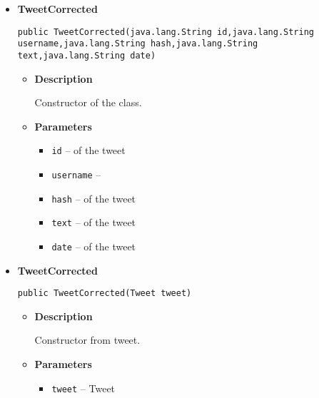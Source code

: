 {{{{{{{{\begin{itemize}
{\begin{itemize}
{Constructor of the class.
}
\item{
{\bf  Parameters}
  \begin{itemize}
   \item{
\texttt{text} -- of the tweet}
  \end{itemize}
}%
\end{itemize}
}%
\item{ 
\hypertarget{com.jmorenov.tweetsccore.twitter.TweetCorrected(java.lang.String, java.lang.String, java.lang.String, java.lang.String, java.lang.String)}{{\bf  TweetCorrected}\\}
\begin{lstlisting}[frame=none]
public TweetCorrected(java.lang.String id,java.lang.String username,java.lang.String hash,java.lang.String text,java.lang.String date)\end{lstlisting} %
\begin{itemize}
\item{
{\bf  Description}

Constructor of the class.
}
\item{
{\bf  Parameters}
  \begin{itemize}
   \item{
\texttt{id} -- of the tweet}
   \item{
\texttt{username} -- }
   \item{
\texttt{hash} -- of the tweet}
   \item{
\texttt{text} -- of the tweet}
   \item{
\texttt{date} -- of the tweet}
  \end{itemize}
}%
\end{itemize}
}%
\item{ 
\hypertarget{com.jmorenov.tweetsccore.twitter.TweetCorrected(com.jmorenov.tweetsccore.twitter.Tweet)}{{\bf  TweetCorrected}\\}
\begin{lstlisting}[frame=none]
public TweetCorrected(Tweet tweet)\end{lstlisting} %
\begin{itemize}
\item{
{\bf  Description}

Constructor from tweet.
}
\item{
{\bf  Parameters}
  \begin{itemize}
   \item{
\texttt{tweet} -- Tweet}
  \end{itemize}
}%
\end{itemize}
}%
\end{itemize}
}
}}}}}}}
